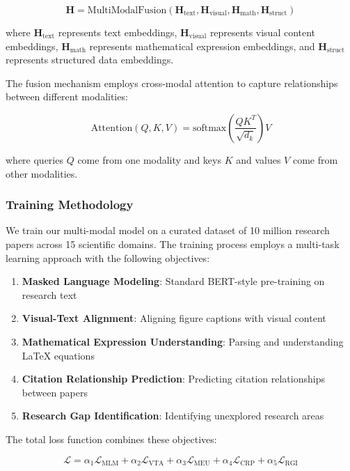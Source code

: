 \documentclass[10pt,twocolumn]{article}
\begin{document}
\begin{equation}
\mathbf{H} = \text{MultiModalFusion}(\mathbf{H}_{\text{text}}, \mathbf{H}_{\text{visual}}, \mathbf{H}_{\text{math}}, \mathbf{H}_{\text{struct}})
\end{equation}

where $\mathbf{H}_{\text{text}}$ represents text embeddings, $\mathbf{H}_{\text{visual}}$ represents visual content embeddings, $\mathbf{H}_{\text{math}}$ represents mathematical expression embeddings, and $\mathbf{H}_{\text{struct}}$ represents structured data embeddings.

The fusion mechanism employs cross-modal attention to capture relationships between different modalities:

\begin{equation}
\text{Attention}(Q, K, V) = \text{softmax}\left(\frac{QK^T}{\sqrt{d_k}}\right)V
\end{equation}

where queries $Q$ come from one modality and keys $K$ and values $V$ come from other modalities.

\subsubsection{Training Methodology}

We train our multi-modal model on a curated dataset of 10 million research papers across 15 scientific domains. The training process employs a multi-task learning approach with the following objectives:

\begin{enumerate}
    \item \textbf{Masked Language Modeling}: Standard BERT-style pre-training on research text
    \item \textbf{Visual-Text Alignment}: Aligning figure captions with visual content
    \item \textbf{Mathematical Expression Understanding}: Parsing and understanding LaTeX equations
    \item \textbf{Citation Relationship Prediction}: Predicting citation relationships between papers
    \item \textbf{Research Gap Identification}: Identifying unexplored research areas
\end{enumerate}

The total loss function combines these objectives:

\begin{equation}
\mathcal{L} = \alpha_1\mathcal{L}_{\text{MLM}} + \alpha_2\mathcal{L}_{\text{VTA}} + \alpha_3\mathcal{L}_{\text{MEU}} + \alpha_4\mathcal{L}_{\text{CRP}} + \alpha_5\mathcal{L}_{\text{RGI}}
\end{equation}
\end{document}

